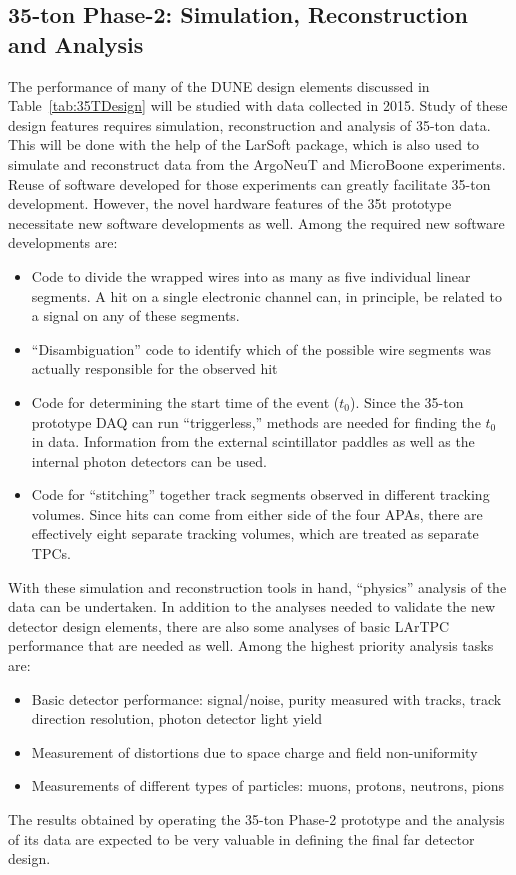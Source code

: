 \subsection{35-ton Phase-2: Simulation, Reconstruction and Analysis}
The performance of many of the DUNE design elements discussed in
Table~\ref{tab:35TDesign} will be studied with data collected in 2015.
Study of these design features requires simulation, reconstruction and
analysis of 35-ton data.  This will be done with the help of the
LarSoft package, which is also used to simulate and reconstruct data
from the ArgoNeuT and MicroBoone experiments.  Reuse of software
developed for those experiments can greatly facilitate 35-ton
development.  However, the novel hardware features of the 35t
prototype necessitate new software developments as well.  Among the
required new software developments are:
\begin{itemize}
\item{Code to divide the wrapped wires into as many as five individual linear segments. 
A hit on a single electronic channel can, in principle, be related to a
signal on any of these segments.}
\item{``Disambiguation'' code to identify which of the possible wire segments was actually responsible
for the observed hit}
\item{Code for determining the start time of the event ($t_0$). Since the 35-ton prototype DAQ can
run ``triggerless,'' methods are needed for finding the $t_0$ in data. Information from the external 
scintillator paddles as well as the internal photon detectors can be used.}
\item{Code for ``stitching'' together track segments observed in different tracking volumes. 
Since hits can come from either side of the four APAs, there are 
effectively eight separate tracking volumes, 
which are treated as separate TPCs.}
\end{itemize}

With these simulation and reconstruction tools in hand, ``physics''
analysis of the data can be undertaken.
In addition to the analyses needed to validate the new detector design elements, there are also
some analyses of basic LArTPC performance that are needed as well.
Among the highest priority analysis tasks are:

\begin{itemize}
\item{Basic detector performance: signal/noise, purity measured with tracks, track direction resolution, 
photon detector light yield}
\item{Measurement of distortions due to space charge and field non-uniformity}
\item{Measurements of different types of particles: muons, protons, neutrons, pions}
\end{itemize}

The results obtained by operating the 35-ton Phase-2 prototype and the analysis of its data are expected
to be very valuable in defining the final far detector design. 
